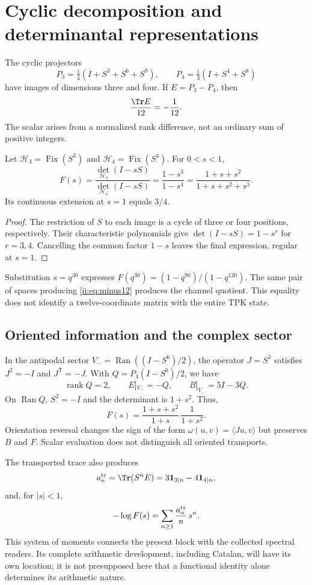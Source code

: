 \section{Cyclic decomposition and determinantal representations}
The cyclic projectors
\[
P_3=\tfrac14(I+S^3+S^6+S^9),\qquad
P_4=\tfrac13(I+S^4+S^8)
\]
have images of dimensions three and four. If $E=P_3-P_4$, then
\begin{equation}
\frac{\Tr E}{12}=-\frac1{12}.
\label{ii:eq:minus12}
\end{equation}
The scalar arises from a normalized rank difference, not an ordinary sum of positive integers.

\begin{theorem}
Let $\mathcal H_3=\operatorname{Fix}(S^3)$ and
$\mathcal H_4=\operatorname{Fix}(S^4)$. For $0<s<1$,
\begin{equation}
F(s)=\frac{\det_{\mathcal H_3}(I-sS)}{\det_{\mathcal H_4}(I-sS)}
=\frac{1-s^3}{1-s^4}
=\frac{1+s+s^2}{1+s+s^2+s^3}.
\label{ii:eq:det}
\end{equation}
Its continuous extension at $s=1$ equals $3/4$.
\end{theorem}
\begin{proof}
The restriction of $S$ to each image is a cycle of three or four positions, respectively. Their characteristic polynomials give $\det(I-sS)=1-s^r$ for $r=3,4$. Cancelling the common factor $1-s$ leaves the final expression, regular at $s=1$.
\end{proof}

Substitution $s=q^{30}$ expresses $F(q^{30})=(1-q^{90})/(1-q^{120})$. The same pair of spaces producing \eqref{ii:eq:minus12} produces the channel quotient. This equality does not identify a twelve-coordinate matrix with the entire TPK state.

\subsection{Oriented information and the complex sector}
In the antipodal sector $V_-=\operatorname{Ran}((I-S^6)/2)$, the operator $J=S^3$ satisfies $J^2=-I$ and $J^{\mathsf T}=-J$. With $Q=P_4(I-S^6)/2$, we have
\[
\operatorname{rank}Q=2,\qquad E|_{V_-}=-Q,\qquad B|_{V_-}=5I-3Q.
\]
On $\operatorname{Ran}Q$, $S^2=-I$ and the determinant is $1+s^2$.
Thus,
\[
F(s)=\frac{1+s+s^2}{1+s}\,\frac1{1+s^2}.
\]
Orientation reversal changes the sign of the form $\omega(u,v)=\langle Ju,v\rangle$ but preserves $B$ and $F$. Scalar evaluation does not distinguish all oriented transports.

The transported trace also produces
\[
a_n^{\rm tr}=\Tr(S^nE)=3\mathbf1_{3\mid n}-4\mathbf1_{4\mid n},
\]
and, for $|s|<1$,
\[
-\log F(s)=\sum_{n\ge1}\frac{a_n^{\rm tr}}n\,s^n.
\]
This system of moments connects the present block with the collected spectral readers. Its complete arithmetic development, including Catalan, will have its own location; it is not presupposed here that a functional identity alone determines its arithmetic nature.

